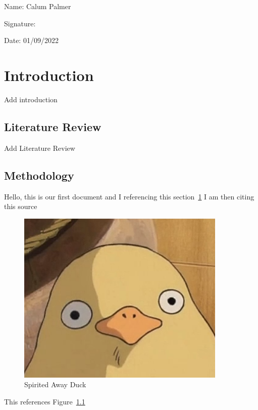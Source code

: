 \documentclass[12pt,a4 paper]{report}
\begin{document}
    \vspace{2cm}
        {\noindent\large Name: Calum Palmer}

    \vspace{0.5cm}
        {\noindent\large Signature: }

    \vspace{0.5cm}
        {\noindent\large Date: 01/09/2022}

    \newpage

    \tableofcontents
    \listoffigures
    \listoftables
    \newpage


    \chapter{Introduction}\label{ch:introduction}

    Add introduction


    \section{Literature Review}\label{sec:literature review}

    Add Literature Review


    \section{Methodology}\label{sec:methodology}

    Hello, this is our first document and I referencing this section~\ref{ch:introduction}
    I am then citing this source~\cite{ani2019victory}

    \begin{figure}
        \centering
        \includegraphics[width=10cm]{figures/SpiritedAwayDuck3}
        \caption{Spirited Away Duck}
        \label{fig:SpiritedAwayDuck}
    \end{figure}


    This references Figure~\ref{fig:SpiritedAwayDuck}

    
\end{document}

